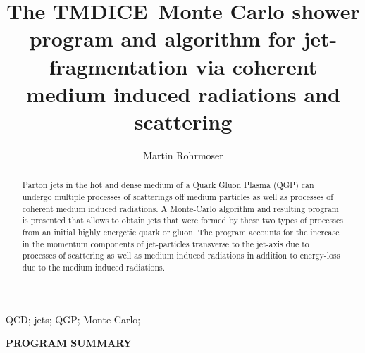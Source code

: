 \documentclass[preprint,12pt]{elsarticle}
\newcommand{\tmdice}{{\sf TMDICE}}
\begin{document}
\begin{frontmatter}



\title{The \tmdice\, Monte Carlo shower program and algorithm for jet-fragmentation via coherent medium induced radiations and scattering}


\author{Martin Rohrmoser}

\address{Cracow University of Technology, Faculty of Materials Engineering and Physics, ul. Podchorą\.{z}ych 1, 30-084 Krak\'ow, Poland,
Institute of Nuclear Physics, Polish Academy of Sciences,\\
  ul.\ Radzikowskiego 152, 31-342 Krak\'ow, Poland}


\begin{abstract}
Parton jets in the hot and dense medium of a Quark Gluon Plasma (QGP) can undergo multiple processes of scatterings off medium particles as well as processes of coherent medium induced radiations. A Monte-Carlo algorithm and resulting program is presented that allows to obtain jets that were formed by these two types of processes from an initial highly energetic quark or gluon. 
The program accounts for the increase in the momentum components of jet-particles transverse to the jet-axis due to processes of scattering as well as medium induced radiations in addition to energy-loss due to the medium induced radiations. 

\end{abstract}

\begin{keyword}
QCD; jets; QGP; Monte-Carlo;

\end{keyword}

\end{frontmatter}



{\bf PROGRAM SUMMARY}
\end{document}
